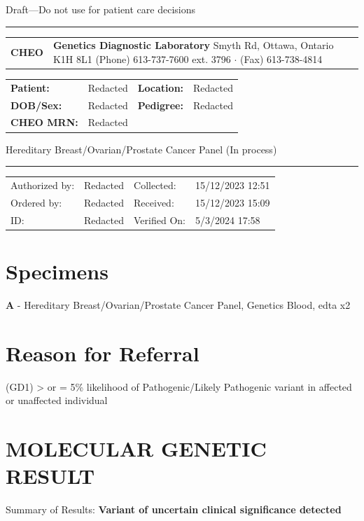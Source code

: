 \documentclass[9pt]{extarticle}
\begin{document}
\begin{center}{\large Draft---Do not use for patient care decisions}\hrule\end{center}


\begin{tabular}{p{2cm} >{\centering\arraybackslash}p{11.59cm} p{2cm}}
{\Huge \bf CHEO} & {\bf Genetics Diagnostic Laboratory} \newline
401 Smyth Rd, Ottawa, Ontario K1H 8L1 \newline
(Phone) 613-737-7600 ext. 3796 $\cdot$ (Fax) 613-738-4814 
& \\
\end{tabular}

\begin{tabular}{p{2cm} p{5.75cm} p{2cm} p{5.75cm}}
{\bf Patient:} & Redacted & {\bf Location:} & Redacted \\
{\bf DOB/Sex:} & Redacted & {\bf Pedigree:} & Redacted\\
{\bf CHEO MRN:} & Redacted & & \\
\end{tabular}

Hereditary Breast/Ovarian/Prostate Cancer Panel (In process) 
\hrule
\begin{tabular}{p{2cm} p{5.75cm} p{2cm} p{5.75cm}}
Authorized by: & Redacted & Collected: & 15/12/2023 12:51 \\
Ordered by: & Redacted & Received: & 15/12/2023 15:09 \\
ID: & Redacted & Verified On: & 5/3/2024 17:58 \\
\end{tabular}

\section*{Specimens}
{\bf A} -  Hereditary Breast/Ovarian/Prostate Cancer Panel, Genetics Blood, edta x2

\section*{Reason for Referral}
(GD1) > or = 5\% likelihood of Pathogenic/Likely Pathogenic variant in affected or unaffected individual

\section*{MOLECULAR GENETIC RESULT}
Summary of Results: {\bf Variant of uncertain clinical significance detected}
\end{document}
